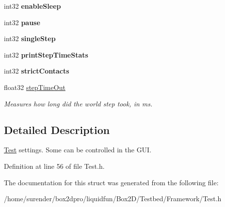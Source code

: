 \begin{DoxyCompactItemize}
\item 
\hypertarget{structSettings_aa78c71c9cf421a97550c4c108dc101b4}{int32 {\bfseries enable\-Sleep}}\label{structSettings_aa78c71c9cf421a97550c4c108dc101b4}

\item 
\hypertarget{structSettings_a8be95d53012a813806bd14fdf3d02885}{int32 {\bfseries pause}}\label{structSettings_a8be95d53012a813806bd14fdf3d02885}

\item 
\hypertarget{structSettings_ab26356e864848394be4ae8bc76850d05}{int32 {\bfseries single\-Step}}\label{structSettings_ab26356e864848394be4ae8bc76850d05}

\item 
\hypertarget{structSettings_a1213104d2d7e03fb9132c5728a60e0d2}{int32 {\bfseries print\-Step\-Time\-Stats}}\label{structSettings_a1213104d2d7e03fb9132c5728a60e0d2}

\item 
\hypertarget{structSettings_a92a470f22525c9eb07d1d4984460b920}{int32 {\bfseries strict\-Contacts}}\label{structSettings_a92a470f22525c9eb07d1d4984460b920}

\item 
\hypertarget{structSettings_af9f07b2174ca26b523fd1cd5aad1ad22}{float32 \hyperlink{structSettings_af9f07b2174ca26b523fd1cd5aad1ad22}{step\-Time\-Out}}\label{structSettings_af9f07b2174ca26b523fd1cd5aad1ad22}

\begin{DoxyCompactList}\small\item\em Measures how long did the world step took, in ms. \end{DoxyCompactList}\end{DoxyCompactItemize}


\subsection{Detailed Description}
\hyperlink{classTest}{Test} settings. Some can be controlled in the G\-U\-I. 

Definition at line 56 of file Test.\-h.



The documentation for this struct was generated from the following file\-:\begin{DoxyCompactItemize}
\item 
/home/surender/box2dpro/liquidfun/\-Box2\-D/\-Testbed/\-Framework/Test.\-h\end{DoxyCompactItemize}
